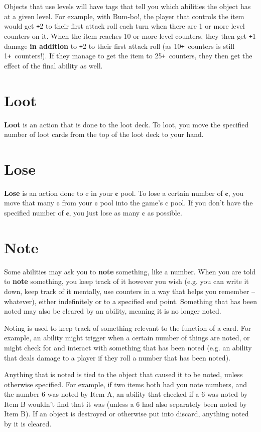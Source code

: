 \documentclass[a4paper, twoside]{report} %
\def\plus{\texttt{+}}
\begin{document}
    Objects that use levels will have tags that tell you which abilities the object has at a given level. For example, with Bum-bo!, the player that controls the item would get \plus2 to their first attack roll each turn when there are 1 or more level counters on it. When the item reaches 10 or more level counters, they then get \plus1 damage \textbf{in addition} to \plus2 to their first attack roll (as 10\plus\ counters is still 1\plus\ counters!). If they manage to get the item to 25\plus\ counters, they then get the effect of the final ability as well.
    \section{Loot}
    \textbf{Loot} is an action that is done to the loot deck. To loot, you move the specified number of loot cards from the top of the loot deck to your hand.
    \section{Lose}
    \textbf{Lose} is an action done to ¢ in your ¢ pool. To lose a certain number of ¢, you move that many ¢ from your ¢ pool into the game’s ¢ pool. If you don’t have the specified number of ¢, you just lose as many ¢ as possible.
    \section{Note}
    Some abilities may ask you to \textbf{note} something, like a number. When you are told to \textbf{note} something, you keep track of it however you wish (e.g. you can write it down, keep track of it mentally, use counters in a way that helps you remember – whatever), either indefinitely or to a specified end point. Something that has been noted may also be cleared by an ability, meaning it is no longer noted.

    Noting is used to keep track of something relevant to the function of a card. For example, an ability might trigger when a certain number of things are noted, or might check for and interact with something that has been noted (e.g. an ability that deals damage to a player if they roll a number that has been noted).

    Anything that is noted is tied to the object that caused it to be noted, unless otherwise specified. For example, if two items both had you note numbers, and the number 6 was noted by Item A, an ability that checked if a 6 was noted by Item B wouldn’t find that it was (unless a 6 had also separately been noted by Item B). If an object is destroyed or otherwise put into discard, anything noted by it is cleared.
\end{document}
